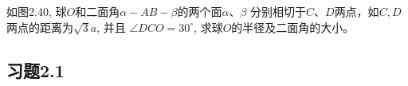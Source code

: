 \begin{example}
    如图2.40, 球$O$和二面角$\alpha-AB-\beta$的两个面$\alpha$、$\beta$
分别相切于$C$、$D$两点，如$C,D$两点的距离为$\sqrt{3}a$, 并且
$\angle DCO=30^{\circ}$, 求球$O$的半径及二面角的大小。
\end{example}

\begin{example}
    
\end{example}


\begin{solution}
    
\end{solution}

\begin{solution}
    
\end{solution}

\begin{solution}
    
\end{solution}
















\subsection*{习题2.1}

